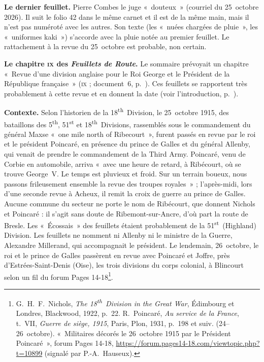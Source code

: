 \textbf{Le dernier feuillet.} Pierre Combes le juge «~douteux~» (courriel du 25~octobre 2026). Il suit le folio 42 dans le même carnet et il est de la même main, mais il n'est pas numéroté avec les autres. Son texte (les «~nuées chargées de pluie~», les «~uniformes kaki~») s'accorde avec la pluie notée au premier feuillet. Le rattachement à la revue du 25~octobre est probable, non certain.

\textbf{Le chapitre \textsc{ix} des \textit{Feuillets de Route}.} Le sommaire prévoyait un chapitre «~Revue d'une division anglaise pour le Roi George et le Président de la République française~» (\textsc{ix} ; document~6, p.~\pageref{annexe:doc6-ix}). Ces feuillets se rapportent très probablement à cette revue et en donnent la date (voir l'introduction, p.~\pageref{intro:revue}).

\textbf{Contexte.} Selon l'historien de la 18\textsuperscript{th}~Division, le 25~octobre 1915, des bataillons des 5\textsuperscript{th}, 51\textsuperscript{st} et 18\textsuperscript{th}~Divisions, rassemblés sous le commandement du général Maxse «~one mile north of Ribecourt~», furent passés en revue par le roi et le président Poincaré, en présence du prince de Galles et du général Allenby, qui venait de prendre le commandement de la Third Army. Poincaré, venu de Corbie en automobile, arriva «~avec une heure de retard, à Ribécourt, où se trouve George~V. Le temps est pluvieux et froid. Sur un terrain boueux, nous passons frileusement ensemble la revue des troupes royales~» ; l'après-midi, lors d'une seconde revue à Acheux, il remit la croix de guerre au prince de Galles. Aucune commune du secteur ne porte le nom de Ribécourt, que donnent Nichols et Poincaré : il s'agit sans doute de Ribemont-sur-Ancre, d'où part la route de Bresle. Les «~Écossais~» des feuillets étaient probablement de la 51\textsuperscript{st}~(Highland) Division. Les feuillets ne nomment ni Allenby ni le ministre de la Guerre, Alexandre Millerand, qui accompagnait le président. Le lendemain, 26~octobre, le roi et le prince de Galles passèrent en revue avec Poincaré et Joffre, près d'Estrées-Saint-Denis (Oise), les trois divisions du corps colonial, à Blincourt selon un fil du forum Pages 14-18\footnote{G.~H.~F.~Nichols, \textit{The 18\textsuperscript{th}~Division in the Great War}, Édimbourg et Londres, Blackwood, 1922, p.~22. R.~Poincaré, \textit{Au service de la France}, t.~VII, \textit{Guerre de siège, 1915}, Paris, Plon, 1931, p.~198 et suiv. (24--26~octobre). «~Militaires décorés le 26~octobre 1915 par le Président Poincaré~», forum Pages 14-18, \url{https://forum.pages14-18.com/viewtopic.php?t=10899} (signalé par P.-A.~Hauseux).}.

